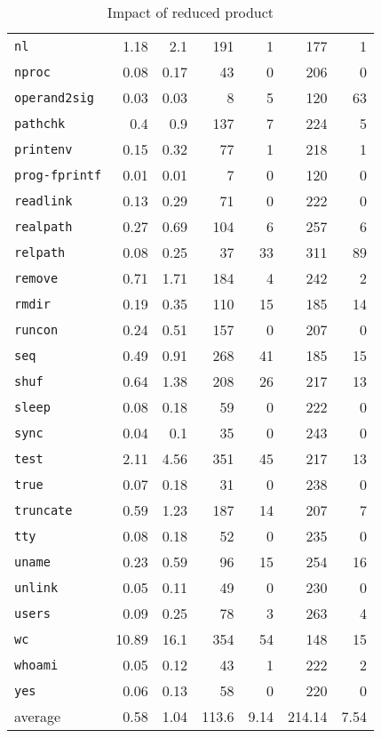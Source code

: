 \documentclass[12pt,oneside]{fithesis2}
\theoremstyle{definition}
\begin{document}
\begin{table}[ht!]
\begin{tabular}{l rrrr | rr}
    \texttt{nl} & 1.18 & 2.1 & 191 & 1 & 177 & 1 \\
    \texttt{nproc} & 0.08 & 0.17 & 43 & 0 & 206 & 0 \\
    \texttt{operand2sig} & 0.03 & 0.03 & 8 & 5 & 120 & 63 \\
    \texttt{pathchk} & 0.4 & 0.9 & 137 & 7 & 224 & 5 \\
    \texttt{printenv} & 0.15 & 0.32 & 77 & 1 & 218 & 1 \\
    \texttt{prog-fprintf} & 0.01 & 0.01 & 7 & 0 & 120 & 0 \\
    \texttt{readlink} & 0.13 & 0.29 & 71 & 0 & 222 & 0 \\
    \texttt{realpath} & 0.27 & 0.69 & 104 & 6 & 257 & 6 \\
    \texttt{relpath} & 0.08 & 0.25 & 37 & 33 & 311 & 89 \\
    \texttt{remove} & 0.71 & 1.71 & 184 & 4 & 242 & 2 \\
    \texttt{rmdir} & 0.19 & 0.35 & 110 & 15 & 185 & 14 \\
    \texttt{runcon} & 0.24 & 0.51 & 157 & 0 & 207 & 0 \\
    \texttt{seq} & 0.49 & 0.91 & 268 & 41 & 185 & 15 \\
    \texttt{shuf} & 0.64 & 1.38 & 208 & 26 & 217 & 13 \\
    \texttt{sleep} & 0.08 & 0.18 & 59 & 0 & 222 & 0 \\
    \texttt{sync} & 0.04 & 0.1 & 35 & 0 & 243 & 0 \\
    \texttt{test} & 2.11 & 4.56 & 351 & 45 & 217 & 13 \\
    \texttt{true} & 0.07 & 0.18 & 31 & 0 & 238 & 0 \\
    \texttt{truncate} & 0.59 & 1.23 & 187 & 14 & 207 & 7 \\
    \texttt{tty} & 0.08 & 0.18 & 52 & 0 & 235 & 0 \\
    \texttt{uname} & 0.23 & 0.59 & 96 & 15 & 254 & 16 \\
    \texttt{unlink} & 0.05 & 0.11 & 49 & 0 & 230 & 0 \\
    \texttt{users} & 0.09 & 0.25 & 78 & 3 & 263 & 4 \\
    \texttt{wc} & 10.89 & 16.1 & 354 & 54 & 148 & 15 \\
    \texttt{whoami} & 0.05 & 0.12 & 43 & 1 & 222 & 2 \\
    \texttt{yes} & 0.06 & 0.13 & 58 & 0 & 220 & 0 \\
    \midrule
    average & 0.58 & 1.04 & 113.6 & 9.14 & 214.14 & 7.54 \\

  \end{tabular}
  \caption{Impact of reduced product}
\end{table}
\end{document}
